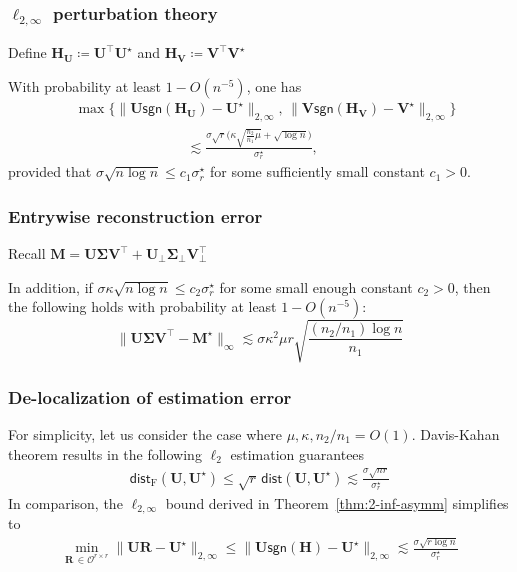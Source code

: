 \documentclass[compress,
mathserif,wide,%
]{beamer}
\begin{document}
\begin{frame}
	\frametitle{$\ell_{2, \infty}$ perturbation theory}
	Define $\bm{H}_{\bm{U}}\coloneqq\bm{U}^{\top}\bm{U}^{\star}$ and
$\bm{H}_{\bm{V}}\coloneqq\bm{V}^{\top}\bm{V}^{\star}$

\vfill
\begin{theorem}
\label{thm:2-inf-asymm}
With probability
at least $1-O(n^{-5})$, one has
%
\begin{align*}
	& \max\Big\{\|\bm{U}\mathsf{sgn}(\bm{H}_{\bm{U}})-\bm{U}^{\star}\|_{2,\infty},\, \|\bm{V}\mathsf{sgn}(\bm{H}_{\bm{V}})-\bm{V}^{\star}\|_{2,\infty} \Big\} \nonumber\\
	& \qquad\qquad\qquad\qquad \lesssim\frac{\sigma\sqrt{ r}\big(\kappa\sqrt{\frac{n_{2}}{n_{1}}\mu}+\sqrt{\log n}\big)}{\sigma_{r}^{\star}},
\end{align*}
%
provided that $\sigma\sqrt{n\log n}\leq c_{1}\sigma_{r}^{\star}$
for some sufficiently small constant $c_{1}>0$. 
%
\end{theorem}

\end{frame}



\begin{frame}
	\frametitle{Entrywise reconstruction error}
	
	Recall $\bm{M} = \bm{U} \bm{\Sigma} \bm{V}^\top + \bm{U}_{\perp} \bm{\Sigma}_{\perp} \bm{V}^\top_{\perp}$
	
	\vfill
	\begin{corollary}
	In addition, if $\sigma\kappa\sqrt{n\log n}\leq c_{2}\sigma_{r}^{\star}$
for some small enough constant $c_{2}>0$, then the following holds with
probability at least $1-O(n^{-5})$:
%
\begin{equation*}
	\|\bm{U}\bm{\Sigma}\bm{V}^{\top}-\bm{M}^{\star}\|_{\infty}\lesssim\sigma\kappa^{2}\mu r\sqrt{\frac{(n_2/n_1) \log n}{n_{1}}}
\end{equation*}
	\end{corollary}
\end{frame}


\begin{frame}
	\frametitle{De-localization of estimation error}
	For simplicity, let us consider the case where $\mu,\kappa, n_2 / n_1 =O(1)$.   Davis-Kahan theorem results in the following $\ell_2$ estimation guarantees 
%
\begin{align*}
	\mathsf{dist}_{\mathrm{F}}(\bm{U},\bm{U}^{\star})  \leq \sqrt{r} \,\mathsf{dist}(\bm{U},\bm{U}^{\star}) \lesssim  \frac{\sigma \sqrt{nr}}{ \sigma_{r}^\star}
\end{align*}
%
In comparison, the $\ell_{2,\infty}$ bound derived in Theorem~\ref{thm:2-inf-asymm} simplifies to
%
\begin{align*}
	\min_{\bm{R}\,\in \mathcal{O}^{r\times r}}\big\|\bm{U} \bm{R}-\bm{U}^{\star}\big\|_{2,\infty}
	 \leq \big\|\bm{U}\mathsf{sgn}(\bm{H})-\bm{U}^{\star}\big\|_{2,\infty}  \lesssim  \frac{\sigma \sqrt{r\log n}}{ \sigma_{r}^\star }
\end{align*}
\end{frame}
\end{document}
